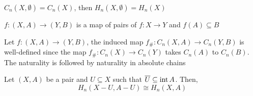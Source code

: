 \documentclass{report}
\begin{document}
\begin{remark}
    $C_n(X, \emptyset) = C_n(X)$, then $H_n(X, \emptyset) = H_n(X)$
\end{remark}

\begin{definition}
    $f: (X, A) \to (Y, B)$ is a map of pairs of $f: X \to Y$ and $f(A) \subseteq B$
\end{definition}

\begin{definition}
    Let $f:(X, A) \to (Y, B)$, the induced map $f_\#: C_n(X, A) \to C_n(Y, B)$ is well-defined since the map $f_\#: C_n(X) \to C_n(Y)$ takes $C_n(A)$ to $C_n(B)$. The naturality is followed by naturality in absolute chains
    \begin{center}
    \end{center}    
\end{definition}

\begin{theorem}[excision]
    Let $(X, A)$ be a pair and $U \subseteq X$ such that $\overline{U} \subseteq \operatorname{int} A$. Then,
    $$
        H_n(X - U, A - U) \cong H_n(X, A)
    $$
\end{theorem}

\begin{longproof}
\end{longproof}



\begin{longproof}
\end{longproof}
\end{document}
